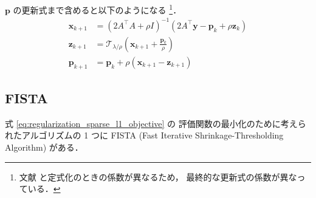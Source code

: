 $\bm{p}$ の更新式まで含めると以下のようになる
\footnote{文献 \cite{Boyd2010} と定式化のときの係数が異なるため，%
    最終的な更新式の係数が異なっている．}．
\begin{align}
    \bm{x}_{k+1} & = (2 A^\top A + \rho I)^{-1} (2 A^\top \bm{y} - \bm{p}_k + \rho \bm{z}_k)
    \\
    \bm{z}_{k+1} & = \mathcal{T}_{\lambda/\rho} \left( \bm{x}_{k+1} + \frac{\bm{p}_k}{\rho} \right)
    \\
    \bm{p}_{k+1} & = \bm{p}_k + \rho (\bm{x}_{k+1} - \bm{z}_{k+1})
\end{align}

\subsection{FISTA}

式 \eqref{eq:regularization_sparse_l1_objective} の
評価関数の最小化のために考えられたアルゴリズムの 1 つに
FISTA (Fast Iterative Shrinkage-Thresholding Algorithm) \cite{Beck2009}
がある．

